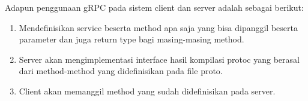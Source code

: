 Adapun penggunaan gRPC pada sistem client dan server adalah sebagai berikut:
\begin{enumerate}
	\item Mendefinisikan service beserta method apa saja yang bisa dipanggil beserta parameter dan juga return type bagi masing-masing method.
	\item  Server akan mengimplementasi interface hasil kompilasi protoc yang berasal dari method-method yang didefinisikan pada file proto.
	\item Client akan memanggil method yang sudah didefinisikan pada server.
\end{enumerate}



%

